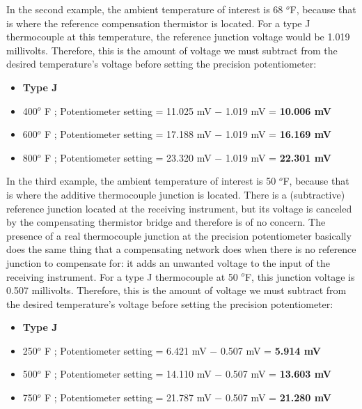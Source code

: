 \begin{itemize}
\begin{itemize}
\vskip 10pt

In the second example, the ambient temperature of interest is 68 $^{o}$F, because that is where the reference compensation thermistor is located.  For a type J thermocouple at this temperature, the reference junction voltage would be 1.019 millivolts.  Therefore, this is the amount of voltage we must subtract from the desired temperature's voltage before setting the precision potentiometer:

\begin{itemize}
\item{} {\bf Type J}
\item{} 400$^{o}$ F ; Potentiometer setting = 11.025 mV $-$ 1.019 mV = {\bf 10.006 mV}
\item{} 600$^{o}$ F ; Potentiometer setting = 17.188 mV $-$ 1.019 mV = {\bf 16.169 mV} 
\item{} 800$^{o}$ F ; Potentiometer setting = 23.320 mV $-$ 1.019 mV = {\bf 22.301 mV} 
\end{itemize}

\vskip 10pt

In the third example, the ambient temperature of interest is 50 $^{o}$F, because that is where the additive thermocouple junction is located.  There is a (subtractive) reference junction located at the receiving instrument, but its voltage is canceled by the compensating thermistor bridge and therefore is of no concern.  The presence of a real thermocouple junction at the precision potentiometer basically does the same thing that a compensating network does when there is no reference junction to compensate for: it adds an unwanted voltage to the input of the receiving instrument.  For a type J thermocouple at 50 $^{o}$F, this junction voltage is 0.507 millivolts.  Therefore, this is the amount of voltage we must subtract from the desired temperature's voltage before setting the precision potentiometer:

\begin{itemize}
\item{} {\bf Type J}
\item{} 250$^{o}$ F ; Potentiometer setting = 6.421 mV $-$ 0.507 mV = {\bf 5.914 mV} 
\item{} 500$^{o}$ F ; Potentiometer setting = 14.110 mV $-$ 0.507 mV = {\bf 13.603 mV} 
\item{} 750$^{o}$ F ; Potentiometer setting = 21.787 mV $-$ 0.507 mV = {\bf 21.280 mV}
\end{itemize}

















\end{itemize}
\end{itemize}
